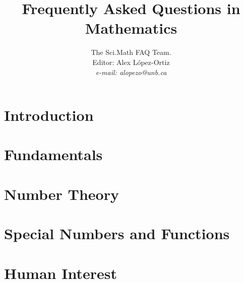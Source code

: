 \documentclass[11pt]{report}
\title{Frequently Asked Questions in Mathematics}
\author{The Sci.Math FAQ Team.\\
Editor: Alex L\'{o}pez-Ortiz  \bigskip  \\
{\it e-mail: alopezo@unb.ca}}
\date{}
\begin{document}
\maketitle
\vfill\pagebreak

\tableofcontents
\vfill\pagebreak


\chapter{Introduction}
  
\chapter{Fundamentals}
  
  
  
  
\chapter{Number Theory}
  
  
\chapter{Special Numbers and Functions}
  
  
  
  
  
  
\chapter{Human Interest}
  
  
  
   
  
  
\end{document}
